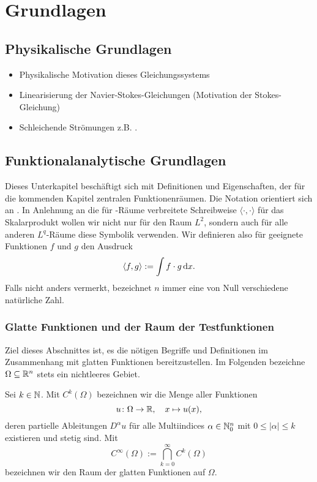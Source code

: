 \chapter{Grundlagen}
\label{cp:grundlagen}

\section{Physikalische Grundlagen}

\begin{itemize}
  \item Physikalische Motivation dieses Gleichungssystems
  \item Linearisierung der Navier-Stokes-Gleichungen (Motivation der Stokes-Gleichung)
  \item Schleichende Strömungen z.B. \cite[S.112,S.489]{spurk10stroemungslehre}. 
\end{itemize}

\section{Funktionalanalytische Grundlagen}

Dieses Unterkapitel beschäftigt sich mit Definitionen und Eigenschaften, der für die kommenden Kapitel zentralen Funktionenräumen.
Die Notation orientiert sich an \cite{sohr2001navier}.
In Anlehnung an die für \hilbert\hyp{}Räume verbreitete Schreibweise $\langle \cdot, \cdot \rangle$ für das Skalarprodukt wollen wir nicht nur für den Raum $L^2$, sondern auch für alle anderen $L^q$\hyp{}Räume diese Symbolik verwenden.
Wir definieren also für geeignete Funktionen $f$ und $g$ den Ausdruck
$$
\langle f, g \rangle := \int f \cdot g \, {\operatorname{d}\!{x}}.
$$
Falls nicht anders vermerkt, bezeichnet $n$ immer eine von Null verschiedene natürliche Zahl.


\subsection{Glatte Funktionen und der Raum der Testfunktionen}
\label{subsec:smooth}

Ziel dieses Abschnittes ist, es die nötigen Begriffe und Definitionen im Zusammenhang mit glatten Funktionen bereitzustellen.
Im Folgenden bezeichne $\Omega \subseteq \mathbb{R}^n$ stets ein nichtleeres Gebiet.

Sei $k \in \mathbb{N}$. Mit $C^k(\Omega)$ bezeichnen wir die Menge aller Funktionen
$$
u \colon \Omega \to \mathbb{R}, \quad x \mapsto u(x),
$$
deren partielle Ableitungen $D^\alpha u$ für alle Multiindices $\alpha \in \mathbb{N}_0^n$ mit $0 \leq |\alpha| \leq k$ existieren und stetig sind. 
Mit
$$
  C^\infty(\Omega) := \bigcap_{k = 0}^\infty C^k(\Omega)
$$
bezeichnen wir den Raum der glatten Funktionen auf $\Omega$.

